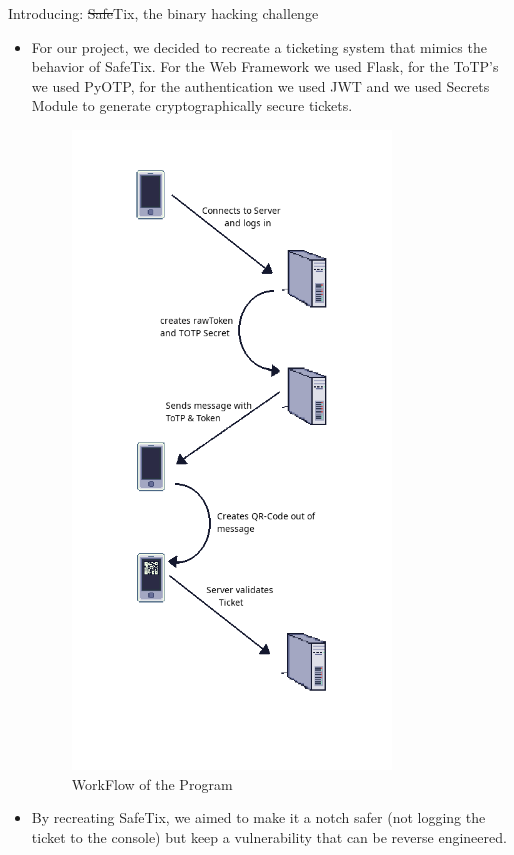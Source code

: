 \documentclass[final,dvipsnames]{beamer}
\newlength{\colwidth}
\begin{document}
\begin{frame}[t, fragile]
\begin{columns}[t]
\begin{column}{\colwidth}
\begin{block}{Introducing: \sout{Safe}Tix, the binary hacking challenge}
		\begin{itemize}
			\item For our project, we decided to recreate a ticketing system that mimics the behavior of SafeTix. 
			For the Web Framework we used Flask, for the ToTP's we used PyOTP, for the authentication we used JWT 
			and we used Secrets Module to generate cryptographically secure tickets.
            \begin{figure}[h]
				\centering
				\includegraphics[width=0.8\textwidth]{figures/Workflow.png}
				\caption{WorkFlow of the Program}
				\label{fig:WorkFlow1}
			\end{figure}
			\item By recreating SafeTix, we aimed to make it a notch safer (not logging the ticket to the console) but keep a vulnerability that can be reverse engineered. 

\end{itemize}
\end{block}
\end{column}
\end{columns}
\end{frame}
\end{document}
